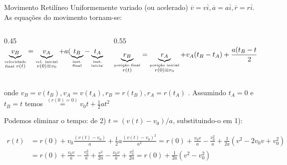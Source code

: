 \documentclass{beamer}
\begin{document}
	\begin{frame}{Movimento Retilíneo Uniformemente variado (ou acelerado)}
		\scriptsize
		$\overline{v} = v\overline{i}  ,  \overline{a} = a\overline{i} , \overline{r} = r\overline{i}$. As equações do movimento tornam-se:
		
		\vspace{0.1cm}
		\begin{columns}[T]
			\begin{column}{0.45\textwidth}
				$\displaystyle \underbrace{v_B}_{\substack{\text{\tiny velocidade} \\ \text{\tiny final } v(t)}} = \underbrace{v_A}_{\substack{\text{\tiny vel. inicial} \\ \text{\tiny } v(0) \equiv v_0}} + a( \underbrace{t_B}_{\substack{\text{\tiny inst.} \\ \text{\tiny final}}} - \underbrace{t_A}_{\substack{\text{\tiny inst.} \\ \text{\tiny inicial}}} )$
			\end{column}
			\begin{column}{0.55\textwidth}
				$\displaystyle \underbrace{r_B}_{\substack{\text{\tiny posição final} \\ \text{\tiny } r(t)}} = \underbrace{r_A}_{\substack{\text{\tiny posição inicial} \\ \text{\tiny } r(0) \equiv r_0}} + v_A(t_B - t_A) + \frac{a(t_B - t_A)^2}{2}$
			\end{column}
		\end{columns}
		onde $v_B=v(t_B), v_A=v(t_A), r_B=r(t_B), r_A=r(t_A)$ .
		\vspace{0.2cm}
		Assumindo $t_A = 0$ e $ t_B = t$ temos \hspace{1cm}
		\quad $\overset{(r(0)=0)}{=} v_0 t + \frac{1}{2} a t^2$
		
		\vspace{0.2cm}
		Podemos eliminar o tempo: de 2) $t = (v(t) - v_0)/a$, substituindo-o em 1):
		
		\vspace{0.1cm}
		$\displaystyle \begin{aligned}
			r(t) &= r(0) + v_0 \frac{(v(t) - v_0)}{a} + \frac{1}{2} a \frac{(v(t) - v_0)^2}{a^2} = r(0) + \frac{v_0 v}{a} - \frac{v_0^2}{a} + \frac{1}{2a}(v^2 - 2v_0 v + v_0^2) \\
			&= r(0) + \frac{v_0 v}{a} - \frac{v_0^2}{a} + \frac{v^2}{2a} - \frac{v_0 v}{a} + \frac{v_0^2}{2a} = r(0) + \frac{1}{2a}(v^2 - v_0^2)
		\end{aligned}$
		

\end{frame}
\end{document}

